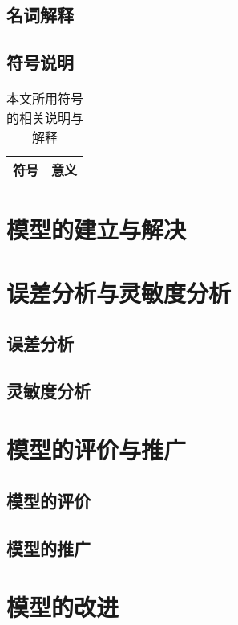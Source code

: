 \documentclass[withoutpreface,bwprint]{cumcmthesis} %
\begin{document}
	\subsection{名词解释}
	\subsection{符号说明}

\begin{table}[!htp]
\centering
\caption{本文所用符号的相关说明与解释}\label{Tab:1}
\begin{tabular}{cc}
 \toprule[1.5pt]
符号 &   意义 \\ 
\midrule

\bottomrule[1.5pt]
\end{tabular}
\end{table}

\section{模型的建立与解决}

\section{误差分析与灵敏度分析}
	\subsection{误差分析}

	\subsection{灵敏度分析}

\section{模型的评价与推广}
	\subsection{模型的评价}

	\subsection{模型的推广}

\section{模型的改进}
\end{document}
